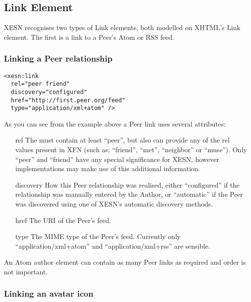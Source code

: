 \documentclass[titlepage,english,a4paper,twoside,dvips]{article}
\begin{document}
\subsection{Link Element}

XESN recognises two types of Link elements, both modelled on XHTML's Link element.  The first is a link to a Peer's Atom or RSS feed.

\subsubsection{Linking a Peer relationship}

\begin{verbatim}
<xesn:link 
  rel="peer friend" 
  discovery="configured" 
  href="http://first.peer.org/feed" 
  type="application/xml+atom" />
\end{verbatim}

As you can see from the example above a Peer link uses several attributes:

\begin{itemize}

\item[rel] The must contain at least ``peer'', but also can provide any of the rel values present in XFN (such as; ``friend'', ``met'', ``neighbor'' or ``muse'').  Only ``peer'' and ``friend'' have any special significance for XESN, however implementations may make use of this additional information.

\item[discovery] How this Peer relationship was realised, either ``configured'' if the relationship was manually entered by the Author, or ``automatic'' if the Peer was discovered using one of XESN's automatic discovery methods. 

\item[href] The URI of the Peer's feed.

\item[type] The MIME type of the Peer's feed.  Currently only ``application/xml+atom'' and ``application/xml+rss'' are sensible.

\end{itemize}

An Atom author element can contain as many Peer links as required and order is not important.

\subsubsection{Linking an avatar icon}
\end{document}

